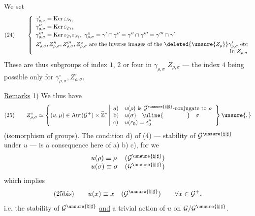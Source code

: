 
We set
\[
(24)\qquad
\left\{
\begin{array}{l}
\gamma'_{\rho,\sigma}=\operatorname{Ker}\varepsilon_{3\gamma},\\[2pt]
\gamma''_{\rho,\sigma}=\operatorname{Ker}\varepsilon_{2\gamma},\\[2pt]
\gamma'''_{\rho,\sigma}=\operatorname{Ker}\varepsilon_{2\gamma}\varepsilon_{3\gamma},\
\gamma^\circ_{\rho,\sigma}=\gamma'\cap\gamma''=\gamma''\cap\gamma'''
=\gamma'''\cap\gamma'\\[4pt]
Z'_{\rho,\sigma},Z''_{\rho,\sigma},Z'''_{\rho,\sigma},Z^\circ_{\rho,\sigma}
\text{ are the inverse images of the }\deleted{\unsure{Z_\rho}}
\gamma'_{\rho,\sigma}\text{ etc}\\
\hfill\text{in }Z_{\rho,\sigma}
\end{array}
\right.
\]
These are thus subgroups of index $1$,  $2$ or four in
$\gamma_{\rho,\sigma}$ \unsure{resp.} $Z_{\rho,\sigma}$ --- the index $4$ being
possible only for $\gamma^\circ_{\rho,\sigma},Z^\circ_{\rho,\sigma}$.

\uline{Remarks} 1) We thus have
\[
(25)\qquad
Z^\circ_{\rho,\sigma}\simeq
\left\{
(u,\mu)\in\operatorname{Aut}(\mathcal{G}^{+})\times\widehat{\mathbb{Z}}^{*}
\left|
\begin{array}{ll}
\mathrm{a})&u(\rho)\text{ is }\mathcal{G}^{\unsure{\natural|\sharp}}\text{-conjugate to }\rho\\
\mathrm{b})&u(\sigma)\quad\uline{\hspace{4em}}\quad\sigma\\
\mathrm{c})&u(\varepsilon_0)=\varepsilon_0^\mu
\end{array}
\right.
\right\}\unsure{,}
\]
(isomorphism of groups). The condition d) of (4) ---
stability of $\mathcal{G}^{\unsure{\natural|\sharp}}$ under $u$ --- is a consequence
here of a) b) c), for we \unsure{will have}
\[
\begin{array}{ll}
u(\rho)\equiv\rho&(\mathcal{G}^{\unsure{\natural|\sharp}})\\
u(\sigma)\equiv\sigma&(\mathcal{G}^{\unsure{\natural|\sharp}})
\end{array}
\]
which implies
\[
(25\mathrm{bis})\qquad
u(x)\equiv x\quad(\mathcal{G}^{\unsure{\natural|\sharp}})
\qquad \forall x\in\mathcal{G}^{+},
\]
i.e. the stability of $\mathcal{G}^{\unsure{\natural|\sharp}}$ \uline{and} a trivial action of
$u$ on $\mathcal{G}/\mathcal{G}^{\unsure{\natural|\sharp}}$.


